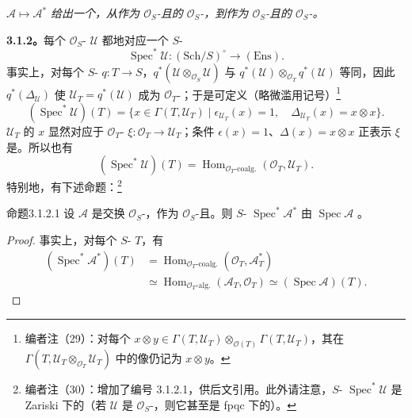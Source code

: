 \emph{ $\mathcal A\mapsto\mathcal A^*$ 给出一个，从作为 $\mathcal O_S$-且的 $\mathcal O_S$-，到作为 $\mathcal O_S$-且的 $\mathcal O_S$-。}

\textbf{3.1.2。}每个 $\mathcal O_S$- $\mathcal U$ 都地对应一个 $S$-
\[
\operatorname{Spec}^*\mathcal U:(\mathrm{Sch}/S)^\circ\longrightarrow(\mathrm{Ens}).
\]
事实上，对每个 $S$- $q:T\to S$，$q^*(\mathcal U\otimes_{\mathcal O_S}\mathcal U)$ 与 $q^*(\mathcal U)\otimes_{\mathcal O_T}q^*(\mathcal U)$ 等同，因此 $q^*(\Delta_{\mathcal U})$ 使 $\mathcal U_T=q^*(\mathcal U)$ 成为 $\mathcal O_T$-；于是可定义（略微滥用记号）\footnote{编者注（29）：对每个 $x\otimes y\in\Gamma(T,\mathcal U_T)\otimes_{\mathcal O(T)}\Gamma(T,\mathcal U_T)$，其在 $\Gamma(T,\mathcal U_T\otimes_{\mathcal O_T}\mathcal U_T)$ 中的像仍记为 $x\otimes y$。}
\[
(\operatorname{Spec}^*\mathcal U)(T)=\{x\in\Gamma(T,\mathcal U_T)\mid\epsilon_{\mathcal U_T}(x)=1,\quad\Delta_{\mathcal U_T}(x)=x\otimes x\}.
\]
$\mathcal U_T$ 的 $x$ 显然对应于 $\mathcal O_T$- $\xi:\mathcal O_T\to\mathcal U_T$；条件 $\epsilon(x)=1$、$\Delta(x)=x\otimes x$ 正表示 $\xi$ 是。所以也有
\[
(\operatorname{Spec}^*\mathcal U)(T)=\operatorname{Hom}_{\mathcal O_T\text{-coalg.}}(\mathcal O_T,\mathcal U_T).
\]
特别地，有下述命题：\footnote{编者注（30）：增加了编号 3.1.2.1，供后文引用。此外请注意，$S$- $\operatorname{Spec}^*\mathcal U$ 是 Zariski 下的（若 $\mathcal U$ 是 $\mathcal O_S$-，则它甚至是 fpqc 下的）。}
\begin{SGAresult}{命题}{3.1.2.1}
设 $\mathcal A$ 是交换 $\mathcal O_S$-，作为 $\mathcal O_S$-且。则 $S$- $\operatorname{Spec}^*\mathcal A^*$ 由 $\operatorname{Spec}\mathcal A$ 。
\end{SGAresult}
\begin{proof}
事实上，对每个 $S$- $T$，有
\[
\begin{aligned}
(\operatorname{Spec}^*\mathcal A^*)(T)&=\operatorname{Hom}_{\mathcal O_T\text{-coalg.}}(\mathcal O_T,\mathcal A_T^*)\\
&\simeq\operatorname{Hom}_{\mathcal O_T\text{-alg.}}(\mathcal A_T,\mathcal O_T)\simeq(\operatorname{Spec}\mathcal A)(T).
\end{aligned}
\]
\end{proof}
